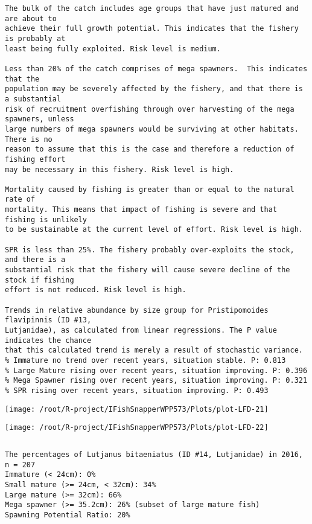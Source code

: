 \documentclass{report}\usepackage[]{graphicx}\usepackage[]{color}
\makeatletter
\def\maxwidth{ %
  \ifdim\Gin@nat@width>\linewidth
    \linewidth
  \else
    \Gin@nat@width
  \fi
}
\newenvironment{kframe}{%
 \def\at@end@of@kframe{}%
 \ifinner\ifhmode%
  \def\at@end@of@kframe{\end{minipage}}%
  \begin{minipage}{\columnwidth}%
 \fi\fi%
 \def\FrameCommand##1{\hskip\@totalleftmargin \hskip-\fboxsep
 \colorbox{shadecolor}{##1}\hskip-\fboxsep
     \hskip-\linewidth \hskip-\@totalleftmargin \hskip\columnwidth}%
 \MakeFramed {\advance\hsize-\width
   \@totalleftmargin\z@ \linewidth\hsize
   \@setminipage}}%
 {\par\unskip\endMakeFramed%
 \at@end@of@kframe}
\newenvironment{knitrout}{}{} %
\makeatother
\begin{document}
\begin{knitrout}
\begin{kframe}
\begin{verbatim}
The bulk of the catch includes age groups that have just matured and are about to
achieve their full growth potential. This indicates that the fishery is probably at
least being fully exploited. Risk level is medium.

Less than 20% of the catch comprises of mega spawners.  This indicates that the
population may be severely affected by the fishery, and that there is a substantial
risk of recruitment overfishing through over harvesting of the mega spawners, unless
large numbers of mega spawners would be surviving at other habitats. There is no
reason to assume that this is the case and therefore a reduction of fishing effort
may be necessary in this fishery. Risk level is high.
 
Mortality caused by fishing is greater than or equal to the natural rate of
mortality. This means that impact of fishing is severe and that fishing is unlikely
to be sustainable at the current level of effort. Risk level is high.
 
SPR is less than 25%. The fishery probably over-exploits the stock, and there is a
substantial risk that the fishery will cause severe decline of the stock if fishing
effort is not reduced. Risk level is high.
 
Trends in relative abundance by size group for Pristipomoides flavipinnis (ID #13,
Lutjanidae), as calculated from linear regressions. The P value indicates the chance
that this calculated trend is merely a result of stochastic variance.
% Immature no trend over recent years, situation stable. P: 0.813
% Large Mature rising over recent years, situation improving. P: 0.396
% Mega Spawner rising over recent years, situation improving. P: 0.321
% SPR rising over recent years, situation improving. P: 0.493
\end{verbatim}
\end{kframe}
\texttt{[image: /root/R-project/IFishSnapperWPP573/Plots/plot-LFD-21]} 

\texttt{[image: /root/R-project/IFishSnapperWPP573/Plots/plot-LFD-22]} 
\begin{kframe}\begin{verbatim}
\end{verbatim}
\end{kframe}
\clearpage
\newpage
\begin{kframe}\begin{verbatim}The percentages of Lutjanus bitaeniatus (ID #14, Lutjanidae) in 2016, n = 207
Immature (< 24cm): 0%
Small mature (>= 24cm, < 32cm): 34%
Large mature (>= 32cm): 66%
Mega spawner (>= 35.2cm): 26% (subset of large mature fish)
Spawning Potential Ratio: 20%
 

\end{verbatim}
\end{kframe}
\end{knitrout}
\end{document}
